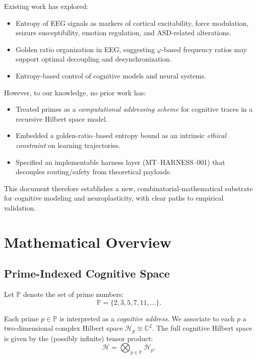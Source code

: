 \documentclass[11pt]{article}
\begin{document}
Existing work has explored:

\begin{itemize}[noitemsep]
  \item Entropy of EEG signals as markers of cortical excitability, force modulation, seizure susceptibility, emotion regulation, and ASD-related alterations. \cite{EEGEntropyForce,EEGEntropySeizure,EEGEntropyBiomarker,EEGEntropyASD,EEGEntropyASD2}
  \item Golden ratio organization in EEG, suggesting $\varphi$-based frequency ratios may support optimal decoupling and desynchronization. \cite{GoldenEEG}
  \item Entropy-based control of cognitive models and neural systems. \cite{EntropyCognitiveModels,EntropyNeuralControl}
\end{itemize}

However, to our knowledge, no prior work has:

\begin{itemize}[noitemsep]
  \item Treated primes as a \emph{computational addressing scheme} for cognitive traces in a recursive Hilbert space model.
  \item Embedded a golden-ratio--based entropy bound as an intrinsic \emph{ethical constraint} on learning trajectories.
  \item Specified an implementable harness layer (MT--HARNESS--001) that decouples routing/safety from theoretical payloads.
\end{itemize}

This document therefore establishes a new, combinatorial-mathematical substrate for cognitive modeling and neuroplasticity, with clear paths to empirical validation.

\section{Mathematical Overview}

\subsection{Prime-Indexed Cognitive Space}

Let $\mathbb{P}$ denote the set of prime numbers:
\[
\mathbb{P} = \{2,3,5,7,11,\dots\}.
\]

Each prime $p \in \mathbb{P}$ is interpreted as a \emph{cognitive address}. We associate to each $p$ a two-dimensional complex Hilbert space $\mathcal{H}_p \cong \mathbb{C}^2$. The full cognitive Hilbert space is given by the (possibly infinite) tensor product:
\[
\mathcal{H} = \bigotimes_{p \in \mathbb{P}} \mathcal{H}_p.
\]
\end{document}
